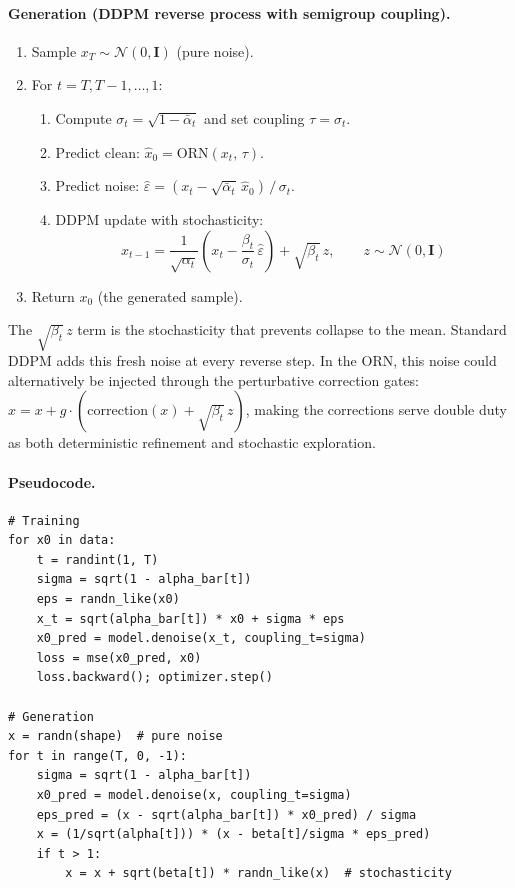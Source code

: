 \documentclass[11pt, a4paper]{article}
\theoremstyle{plain}
\theoremstyle{remark}
\begin{document}
\paragraph{Generation (DDPM reverse process with semigroup coupling).}
\begin{enumerate}[nosep]
    \item Sample $x_T \sim \mathcal{N}(0, \mathbf{I})$ (pure noise).
    \item For $t = T, T{-}1, \ldots, 1$:
    \begin{enumerate}[nosep]
        \item Compute $\sigma_t = \sqrt{1 - \bar{\alpha}_t}$ and set coupling $\tau = \sigma_t$.
        \item Predict clean: $\hat{x}_0 = \text{ORN}(x_t,\, \tau)$.
        \item Predict noise: $\hat{\varepsilon} = (x_t - \sqrt{\bar{\alpha}_t}\,\hat{x}_0) \,/\, \sigma_t$.
        \item DDPM update with stochasticity:
        \[
            x_{t-1} = \frac{1}{\sqrt{\alpha_t}}\left(x_t - \frac{\beta_t}{\sigma_t}\,\hat{\varepsilon}\right) + \sqrt{\beta_t}\,z, \qquad z \sim \mathcal{N}(0, \mathbf{I})
        \]
    \end{enumerate}
    \item Return $x_0$ (the generated sample).
\end{enumerate}

The $\sqrt{\beta_t}\,z$ term is the stochasticity that prevents collapse to the mean.
Standard DDPM adds this fresh noise at every reverse step.
In the ORN, this noise could alternatively be injected through the perturbative correction gates: $x = x + g \cdot (\text{correction}(x) + \sqrt{\beta_t}\,z)$, making the corrections serve double duty as both deterministic refinement and stochastic exploration.

\paragraph{Pseudocode.}
\begin{verbatim}
# Training
for x0 in data:
    t = randint(1, T)
    sigma = sqrt(1 - alpha_bar[t])
    eps = randn_like(x0)
    x_t = sqrt(alpha_bar[t]) * x0 + sigma * eps
    x0_pred = model.denoise(x_t, coupling_t=sigma)
    loss = mse(x0_pred, x0)
    loss.backward(); optimizer.step()

# Generation
x = randn(shape)  # pure noise
for t in range(T, 0, -1):
    sigma = sqrt(1 - alpha_bar[t])
    x0_pred = model.denoise(x, coupling_t=sigma)
    eps_pred = (x - sqrt(alpha_bar[t]) * x0_pred) / sigma
    x = (1/sqrt(alpha[t])) * (x - beta[t]/sigma * eps_pred)
    if t > 1:
        x = x + sqrt(beta[t]) * randn_like(x)  # stochasticity
\end{verbatim}
\end{document}
